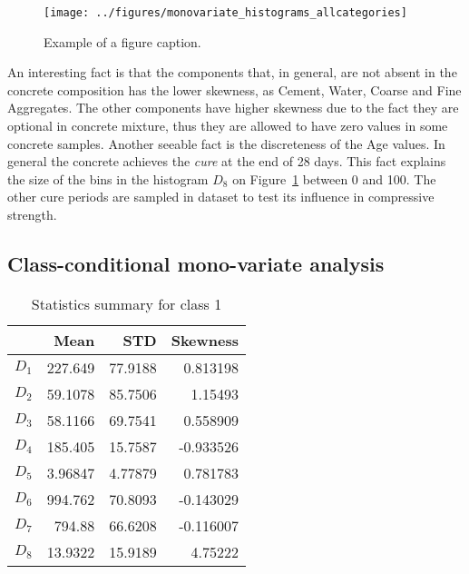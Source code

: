 \documentclass[conference]{IEEEtran}
\begin{document}
\begin{figure}[htbp]
\centerline{\texttt{[image: ../figures/monovariate\_histograms\_allcategories]}}
\caption{Example of a figure caption.}
\label{Unconditional predictors histogram}
\end{figure}

An interesting fact is that the components that, in general, are not absent in the concrete composition has the lower skewness, as Cement, Water, Coarse and Fine Aggregates. The other components have higher skewness due to the fact they are optional in concrete mixture, thus they are allowed to have zero values in some concrete samples. Another seeable fact is the discreteness of the Age values. In general the concrete achieves the \emph{cure} at the end of 28 days. This fact explains the size of the bins in the histogram $D_8$ on Figure~\ref{Unconditional predictors histogram} between 0 and 100. The other cure periods are sampled in dataset to test its influence in compressive strength.

\subsection{Class-conditional mono-variate analysis}

\begin{table}[htp]
  \caption{Statistics summary for class 1}
    \centering
    \begin{tabular}{@{} crrr @{}}
      \toprule
       & Mean & STD & Skewness \\ 
      \midrule
      $D_1$ & 227.649  &   77.9188  &   0.813198 \\ 
      $D_2$ & 59.1078  &  85.7506  &   1.15493 \\ 
      $D_3$ & 58.1166  &  69.7541   &  0.558909 \\ 
      $D_4$ & 185.405  &   15.7587  &  -0.933526\\ 
      $D_5$ & 3.96847  &  4.77879  &  0.781783 \\ 
      $D_6$ & 994.762   &  70.8093  &  -0.143029 \\ 
      $D_7$ & 794.88   &   66.6208  &  -0.116007 \\ 
      $D_8$ & 13.9322  &  15.9189  &   4.75222 \\       
      \bottomrule
    \end{tabular}
  \label{statistics_table_class_1}
  \end{table}%
\end{document}
